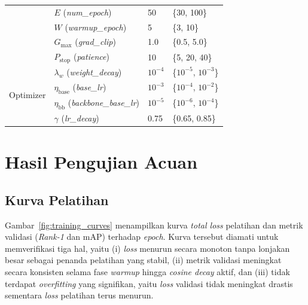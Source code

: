 \begin{table}[htbp]
\begin{tabular}{p{2.8cm} p{3.5cm} p{2cm} p{4.5cm}}
                          & $E$ (\textit{num\_epoch})                        & 50                & \{30, 100\}                              \\
                          & $W$ (\textit{warmup\_epoch})                     & 5                 & \{3, 10\}                                \\
                          & $G_{\max}$ (\textit{grad\_clip})                 & 1{.}0             & \{0{.}5, 5{.}0\}                         \\
                          & $P_{\text{stop}}$ (\textit{patience})            & 10                & \{5, 20, 40\}                            \\
        \hline
        \multirow{4}{*}{Optimizer}
                          & $\lambda_w$ (\textit{weight\_decay})             & $10^{-4}$         & \{$10^{-5}$, $10^{-3}$\}                 \\
                          & $\eta_{\text{base}}$ (\textit{base\_lr})         & $10^{-3}$         & \{$10^{-4}$, $10^{-2}$\}                 \\
                          & $\eta_{\text{bb}}$ (\textit{backbone\_base\_lr}) & $10^{-5}$         & \{$10^{-6}$, $10^{-4}$\}                 \\
                          & $\gamma$ (\textit{lr\_decay})                    & 0{.}75            & \{0{.}65, 0{.}85\}                       \\
        \hline
    \end{tabular}
\end{table}

\section{Hasil Pengujian Acuan}

\subsection{Kurva Pelatihan}

Gambar~\ref{fig:training_curves} menampilkan kurva \textit{total loss} pelatihan dan metrik validasi (\textit{Rank-1} dan mAP) terhadap \textit{epoch}. Kurva tersebut diamati untuk memverifikasi tiga hal, yaitu (i) \textit{loss} menurun secara monoton tanpa lonjakan besar sebagai penanda pelatihan yang stabil, (ii) metrik validasi meningkat secara konsisten selama fase \textit{warmup} hingga \textit{cosine decay} aktif, dan (iii) tidak terdapat \textit{overfitting} yang signifikan, yaitu \textit{loss} validasi tidak meningkat drastis sementara \textit{loss} pelatihan terus menurun.

